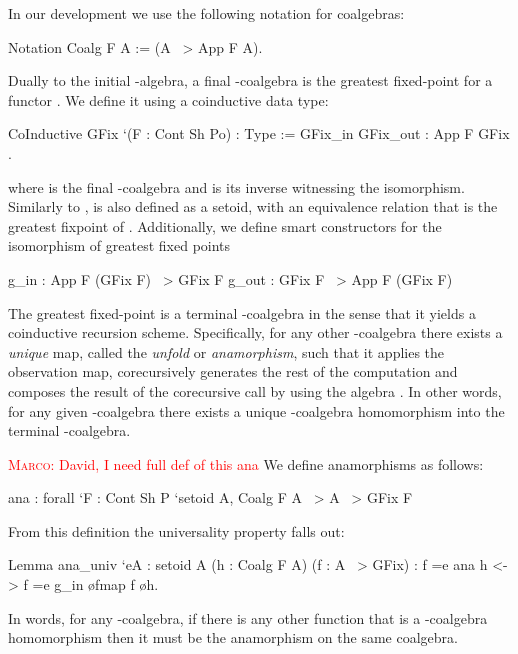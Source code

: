 \documentclass[ a4paper, UKenglish, cleveref, autoref, thm-restate]{lipics-v2021}
\newcommand{\mpav}[1]{\textcolor{red}{\textsc{Marco}: #1}}
\begin{document}
In our development we use the following notation for coalgebras:
\begin{coqcode}
Notation Coalg F A := (A ~> App F A).
\end{coqcode}

Dually to the initial -algebra, a final -coalgebra is the greatest
fixed-point for a functor . We define it using a coinductive data type:
\begin{coqcode}
CoInductive GFix `(F : Cont Sh Po) : Type := GFix_in { GFix_out : App F GFix }.
\end{coqcode}
where  is the final -coalgebra and  is its
inverse witnessing the isomorphism. Similarly to ,  is also
defined as a setoid, with an equivalence relation that is the greatest fixpoint
of . Additionally, we define smart constructors for the isomorphism of
greatest fixed points
\begin{coqcode}
g_in : App F (GFix F) ~> GFix F                g_out : GFix F ~> App F (GFix F)
\end{coqcode}

The greatest fixed-point is a terminal -coalgebra in the sense that it
yields a coinductive recursion scheme. Specifically, for any
other -coalgebra there exists a \emph{unique} map, called the
\emph{unfold} or \emph{anamorphism}, such that it applies the observation map,
corecursively generates the rest of the computation and composes the result of
the corecursive call by using the algebra . In other words, for any
given -coalgebra there exists a unique -coalgebra homomorphism
into the terminal -coalgebra.


\mpav{David, I need full def of this ana}
We define anamorphisms as follows:
\begin{coqcode}
ana : forall `{F : Cont Sh P} `{setoid A}, Coalg F A ~> A ~> GFix F
\end{coqcode}
From this definition the universality property falls out:
\begin{coqcode}
Lemma ana_univ `{eA : setoid A} (h : Coalg F A) (f : A ~> GFix)
: f =e ana h <-> f =e g_in \o fmap f \o h.
\end{coqcode}
In words, for any -coalgebra, if there is any other function  that is a -coalgebra homomorphism then it must be the anamorphism on the same coalgebra.
\end{document}

